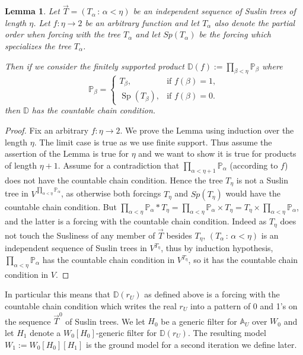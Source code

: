 \documentclass[a4paper,11pt]{article}
\newtheorem{lemma}[theorem]{Lemma}
\newcommand{\forceP}{\mathbb{P}}
\begin{document}
\begin{lemma}\label{ccc Coding}
Let $\vec{T}= (T_{\alpha} \, : \, \alpha < \eta)$ be an independent sequence of Suslin trees of length $\eta$. Let $f: \eta \rightarrow 2$ be an arbitrary function and let $T_{\alpha}$ also denote the partial order when forcing with the tree $T_{\alpha}$ and let $Sp(T_{\alpha})$ be the forcing which specializes the tree $T_{\alpha}$.

Then if we consider the finitely supported product $\mathbb{D} (f) := \prod_{\beta < \eta} \forceP_{\beta}$ where \[
   \forceP_\beta=
   \begin{cases}
   T_\beta, &\text{if } f(\beta)=1,\\
   \operatorname{Sp}(T_\beta), &\text{if } f(\beta)=0.
   \end{cases}
\]
then $\mathbb{D}$ has the countable chain condition.
\end{lemma}
\begin{proof}
Fix an arbitrary $f: \eta \rightarrow 2$. We prove the Lemma using induction over the length $\eta$. The limit case is true as we use finite support. Thus assume the assertion of the Lemma is true for $\eta$ and we want to show it is true for products of length $\eta+1$. Assume for a contradiction that $\prod_{\alpha < \eta+1}\forceP_{\alpha}$ (according to $f$) does not have the countable chain condition.
Hence the tree $T_{\eta}$ is not a Suslin tree in $V^{\prod_{\alpha < \eta} \forceP_{\alpha}}$, as otherwise both forcings $T_{\eta}$ and $Sp(T_{\eta})$ would have the countable chain condition.
But $\prod_{\alpha < \eta} \forceP_{\alpha} \ast T_{\eta} = \prod_{\alpha < \eta} \forceP_{\alpha} \times T_{\eta} = T_{\eta} \times \prod_{\alpha < \eta} \forceP_{\alpha}$, and the latter is a forcing with the countable chain condition. Indeed as $T_{\eta}$ does not touch the Susliness of any member of $\vec{T}$ besides $T_{\eta}$,  $(T_{\alpha} \, : \, \alpha < \eta)$ is an independent sequence of Suslin trees in $V^{T_{\eta}}$, thus
by induction hypothesis,  $\prod_{\alpha < \eta} \forceP_{\alpha}$ has the countable chain condition in $V^{T_{\eta}}$, so it has the countable chain condition in $V$.
\end{proof}

In particular this means that $\mathbb{D} (r_U)$ as defined above is a forcing with the countable chain condition which writes the real $r_U$ into a pattern of 0 and 1's on the sequence $\vec{T}^0$ of Suslin trees. We
let $H_0$ be
a generic filter for $\mathbb{A}_U$ over $W_0$ and
let
 $H_1$ denote a $W_0[H_0]$-generic filter for $\mathbb{D} (r_U)$. The resulting model $W_1:=W_0[H_0][H_1]$ is the ground model for a second iteration we define later.
 
\end{document}
